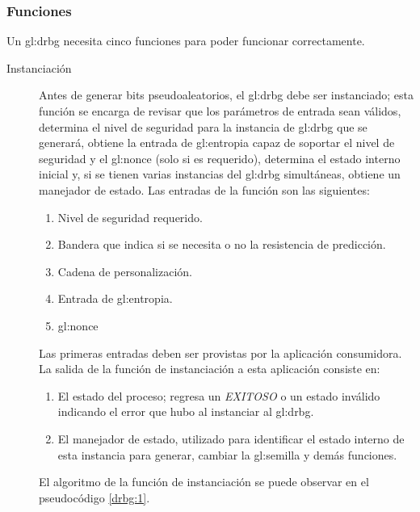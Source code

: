 %
%

\subsubsection{Funciones}

Un \gls{gl:drbg} necesita cinco funciones para poder funcionar correctamente.
\begin{description}
  \item [Instanciación] Antes de generar bits pseudoaleatorios, el \gls{gl:drbg}
    debe ser instanciado; esta función se encarga de revisar que los parámetros
    de entrada sean válidos, determina  el nivel de seguridad para la instancia
    de \gls{gl:drbg} que se generará, obtiene la entrada de \gls{gl:entropia}
    capaz de soportar el nivel de seguridad y el \gls{gl:nonce} (solo si es
    requerido), determina el estado interno inicial y, si se tienen varias
    instancias del \gls{gl:drbg} simultáneas, obtiene un manejador de estado.
    Las entradas de la función son las siguientes:
    \begin{enumerate}
      \item Nivel de seguridad requerido.
      \item Bandera que indica si se necesita o no la resistencia de predicción.
      \item Cadena de personalización.
      \item Entrada de \gls{gl:entropia}.
      \item \gls{gl:nonce}
    \end{enumerate}
    Las primeras entradas deben ser provistas por la aplicación consumidora. La
    salida de la función de instanciación a esta aplicación consiste en:
    \begin{enumerate}
      \item El estado del proceso; regresa un \textit{EXITOSO} o un estado
        inválido indicando el error que hubo al instanciar al \gls{gl:drbg}.
      \item El manejador de estado, utilizado para identificar el estado interno
        de esta instancia para generar, cambiar la \gls{gl:semilla} y demás
        funciones.
    \end{enumerate}
    El algoritmo de la función de instanciación se puede observar en el
    pseudocódigo \ref{drbg:1}.


\end{description}
